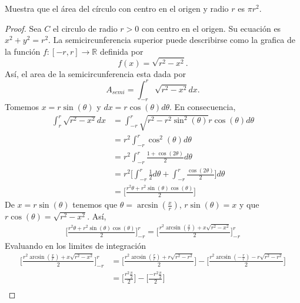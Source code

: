\documentclass[12pt,a4paper]{article}
\begin{document}
    \begin{mdframed}[style=mdbluebox,frametitle={Ejercicio 3}]
        Muestra que el área del círculo con centro en el origen y radio $r$ es $\pi r^{2}$.
    \end{mdframed}

    \begin{proof}
        Sea $C$ el circulo de radio $r\gt0$ con centro en el origen. Su ecuación es
        $x^{2}+y^{2}=r^{2}$. La semicircunferencia superior puede describirse como la
        grafica de la función $f:[-r,r]\to\mathbb{R}$ definida por
        \begin{equation*}
            f(x)=\sqrt{r^{2}-x^{2}}.
        \end{equation*}
        Así, el area de la semicircunferencia esta dada por
        \begin{equation*}
            A_{semi}=\int_{-r}^{r}\sqrt{r^{2}-x^{2}}dx.
        \end{equation*}
        Tomemos $x=r\sin(\theta)$ y $dx=r\cos(\theta)d\theta$. En consecuencia,
        \begin{align*}
            \int_{r}^{r}\sqrt{r^{2}-x^{2}}dx&=\int_{-r}^{r}\sqrt{r^{2}-r^{2}\sin^{2}(\theta)}r\cos(\theta)d\theta\\
            &=r^{2}\int_{-r}^{r}\cos^{2}(\theta)d\theta\\
            &=r^{2}\int_{-r}^{r}\frac{1+\cos(2\theta)}{2}d\theta\\
            &=r^{2}\big[\int_{-r}^{r}\frac{1}{2}d\theta+\int_{-r}^{r}\frac{\cos(2\theta)}{2}\big]d\theta\\
            &=\big[\frac{r^{2}\theta+r^{2}\sin(\theta)\cos(\theta)}{2}\big]
        \end{align*}
        De $x=r\sin(\theta)$ tenemos que $\theta=\arcsin(\frac{x}{r})$, $r\sin(\theta)=x$ y que $r\cos(\theta)=\sqrt{r^{2}-x^{2}}$. Así,
        \begin{align*}
            \big[\frac{r^{2}\theta+r^{2}\sin(\theta)\cos(\theta)}{2}\big]_{-r}^{r}=\big[\frac{r^{2}\arcsin(\frac{x}{r})+x\sqrt{r^{2}-x^{2}}}{2}\big]_{-r}^{r}
        \end{align*}
        Evaluando en los limites de integración
        \begin{align*}
            \big[\frac{r^{2}\arcsin(\frac{x}{r})+x\sqrt{r^{2}-x^{2}}}{2}\big]_{-r}^{r}&=\big[\frac{r^{2}\arcsin(\frac{r}{r})+r\sqrt{r^{2}-r^{2}}}{2}\big]-\big[\frac{r^{2}\arcsin(-\frac{r}{r})-r\sqrt{r^{2}-r^{2}}}{2}\big]\\
            &=\big[\frac{r^{2}\frac{\pi}{2}}{2}\big]-\big[\frac{-r^{2}\frac{\pi}{2}}{2}\big]\\

\end{align*}
\end{proof}
\end{document}
